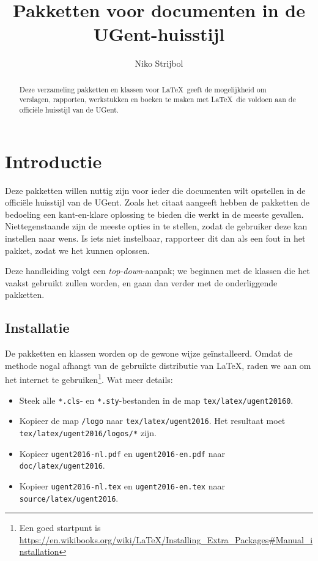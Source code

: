 \documentclass[11pt,parskip=half-]{scrartcl}
\title{Pakketten voor documenten in de UGent-huisstijl}
\author{Niko Strijbol}
\begin{document}
\maketitle

\begin{abstract}
    \noindent Deze verzameling pakketten en klassen voor \LaTeX\ geeft de mogelijkheid om verslagen, rapporten, werkstukken en boeken te maken met \LaTeX\ die voldoen aan de officiële huisstijl van de UGent.
\end{abstract}

\tableofcontents

\section{Introductie}\label{sec:introductie}


Deze pakketten willen nuttig zijn voor ieder die documenten wilt opstellen in de officiële huisstijl van de UGent. Zoals het citaat aangeeft hebben de pakketten de bedoeling een kant-en-klare oplossing te bieden die werkt in de meeste gevallen. Niettegenstaande zijn de meeste opties in te stellen, zodat de gebruiker deze kan instellen naar wens. Is iets niet instelbaar, rapporteer dit dan als een fout in het pakket, zodat we het kunnen oplossen.

Deze handleiding volgt een \emph{top-down}-aanpak; we beginnen met de klassen die het vaakst gebruikt zullen worden, en gaan dan verder met de onderliggende pakketten.

\subsection{Installatie}\label{subsec:installatie}
De pakketten en klassen worden op de gewone wijze geïnstalleerd. Omdat de methode nogal afhangt van de gebruikte distributie van \LaTeX, raden we aan om het internet te gebruiken\footnote{Een goed startpunt is \url{https://en.wikibooks.org/wiki/LaTeX/Installing_Extra_Packages\#Manual_installation}}. Wat meer details:

\begin{itemize}
    \item Steek alle \texttt{*.cls}- en \texttt{*.sty}-bestanden in de map \texttt{tex/latex/ugent20160}.
    \item Kopieer de map \texttt{/logo} naar \texttt{tex/latex/ugent2016}. Het resultaat moet \texttt{tex/latex/ugent2016/logos/*} zijn.
    \item Kopieer \texttt{ugent2016-nl.pdf} en \texttt{ugent2016-en.pdf} naar \texttt{doc/latex/ugent2016}.
    \item Kopieer \texttt{ugent2016-nl.tex} en \texttt{ugent2016-en.tex} naar \texttt{source/latex/ugent2016}.
\end{itemize}
\end{document}
